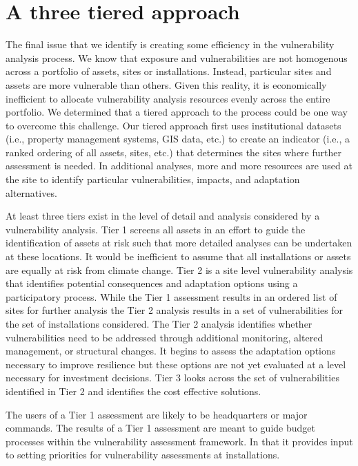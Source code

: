 \documentclass[10pt]{amsart}
\begin{document}
\section{A three tiered approach}
The final issue that we identify is creating some efficiency in the vulnerability analysis process.
We know that exposure and vulnerabilities are not homogenous across a portfolio of assets, sites or installations. 
Instead, particular sites and assets are more vulnerable than others.
Given this reality, it is economically inefficient to allocate vulnerability analysis resources evenly across the entire portfolio.
We determined that a tiered approach to the process could be one way to overcome this challenge. 
Our tiered approach first uses institutional datasets (i.e., property management systems, GIS data, etc.) to create an indicator (i.e., a ranked ordering of all assets, sites, etc.) that determines the sites where further assessment is needed. 
In additional analyses, more and more resources are used at the site to identify particular vulnerabilities, impacts, and adaptation alternatives. 

At least three tiers exist in the level of detail and analysis considered by a vulnerability analysis.
Tier 1 screens all assets in an effort to guide the identification of assets at risk such that more detailed analyses can be undertaken at these locations.
It would be inefficient to assume that all installations or assets are equally at risk from climate change.
Tier 2 is a site level vulnerability analysis that identifies potential consequences and adaptation options using a participatory process.
While the Tier 1 assessment results in an ordered list of sites for further analysis the Tier 2 analysis results in a set of vulnerabilities for the set of installations considered.
The Tier 2 analysis identifies whether vulnerabilities need to be addressed through additional monitoring, altered management, or structural changes.
It begins to assess the adaptation options necessary to improve resilience but these options are not yet evaluated at a level necessary for investment decisions.
Tier 3 looks across the set of vulnerabilities identified in Tier 2 and identifies the cost effective solutions.

The users of a Tier 1 assessment are likely to be headquarters or major commands.
The results of a Tier 1 assessment are meant to guide budget processes within the vulnerability assessment framework.
In that it provides input to setting priorities for vulnerability assessments at installations.
\end{document}
